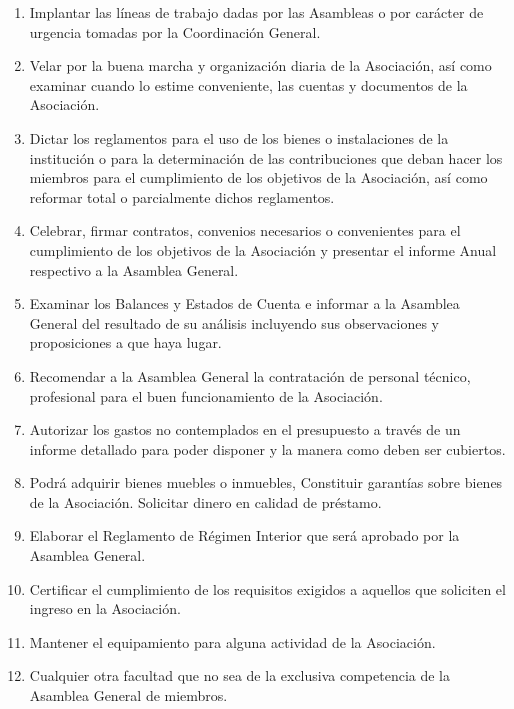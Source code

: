       \begin{enumerate}

        \item
            Implantar las l\'i{}neas de trabajo dadas por las Asambleas o por
            car\'acter de urgencia tomadas por la Coordinaci\'on General. 
        \item    
            Velar por la buena marcha y organizaci\'on diaria de la
            Asociaci\'on, as\'i{} como examinar cuando lo estime conveniente,
            las cuentas y documentos de la Asociaci\'on.
        \item
            Dictar los reglamentos para el uso de los bienes o instalaciones de
            la instituci\'on o para la determinaci\'on de las contribuciones que
            deban hacer los miembros para el cumplimiento de los objetivos de la
            Asociaci\'on, as\'i{} como reformar total o parcialmente dichos
            reglamentos. 
        \item
            Celebrar, firmar contratos, convenios necesarios o convenientes para
            el cumplimiento de los objetivos de la Asociaci\'on y presentar el
            informe Anual respectivo a la Asamblea General.
        \item
            Examinar los Balances y Estados de Cuenta e informar a la Asamblea
            General del resultado de su an\'alisis incluyendo sus observaciones
            y proposiciones a que haya lugar. 
        \item
            Recomendar a la Asamblea General la contrataci\'on de personal
            t\'ecnico, profesional para el buen funcionamiento de la
            Asociaci\'on.
        \item
            Autorizar los gastos no contemplados en el presupuesto a trav\'es de
            un informe detallado para poder disponer y la manera como deben ser
            cubiertos.
        \item
            Podr\'a adquirir bienes muebles o inmuebles, Constituir
            garant\'i{}as sobre bienes de la Asociaci\'on. Solicitar dinero en
            calidad de pr\'estamo.
        \item
            Elaborar el Reglamento de R\'egimen Interior que ser\'a aprobado por
            la Asamblea General.
        \item
            Certificar el cumplimiento de los requisitos exigidos a aquellos que
            soliciten el ingreso en la Asociaci\'on.
        \item
            Mantener el equipamiento para alguna actividad de la Asociaci\'on.
        \item
            Cualquier otra facultad que no sea de la exclusiva competencia de la
            Asamblea General de miembros.

      \end{enumerate}

